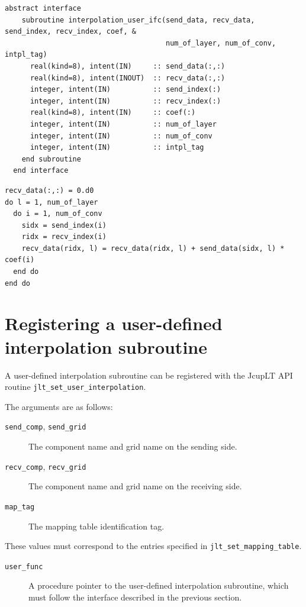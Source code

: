 \documentclass[11pt,a4paper]{report}
\begin{document}
\begin{lstlisting}[caption=Interface of user-defined interpolation subroutine,
                    label=list:interpolation_user_ifc]
  abstract interface
    subroutine interpolation_user_ifc(send_data, recv_data, send_index, recv_index, coef, &
                                      num_of_layer, num_of_conv, intpl_tag)
      real(kind=8), intent(IN)     :: send_data(:,:)
      real(kind=8), intent(INOUT)  :: recv_data(:,:)
      integer, intent(IN)          :: send_index(:)
      integer, intent(IN)          :: recv_index(:)
      real(kind=8), intent(IN)     :: coef(:)
      integer, intent(IN)          :: num_of_layer
      integer, intent(IN)          :: num_of_conv
      integer, intent(IN)          :: intpl_tag
    end subroutine
  end interface
\end{lstlisting}

\begin{lstlisting}[caption=Example of a basic interpolation calculation,
                    label=list:example_interpolation_code]
recv_data(:,:) = 0.d0
do l = 1, num_of_layer
  do i = 1, num_of_conv
    sidx = send_index(i)
    ridx = recv_index(i)
    recv_data(ridx, l) = recv_data(ridx, l) + send_data(sidx, l) * coef(i)
  end do
end do
\end{lstlisting}

\section{Registering a user-defined interpolation subroutine}

A user-defined interpolation subroutine
can be registered with the JcupLT API routine
\texttt{jlt\_set\_user\_interpolation}.

The arguments are as follows:

\begin{description}
\item[\texttt{send\_comp}, \texttt{send\_grid}]
  The component name and grid name on the sending side.
\item[\texttt{recv\_comp}, \texttt{recv\_grid}]
  The component name and grid name on the receiving side.
\item[\texttt{map\_tag}]
  The mapping table identification tag.
\end{description}

These values must correspond to the entries
specified in \texttt{jlt\_set\_mapping\_table}.

\begin{description}
\item[\texttt{user\_func}]
  A procedure pointer to the user-defined
  interpolation subroutine,
  which must follow the interface
  described in the previous section.
\end{description}
\end{document}
